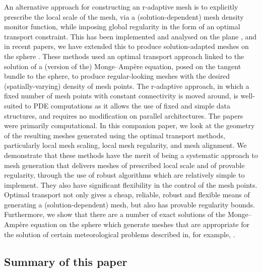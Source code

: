 \documentclass[11pt, a4paper]{scrartcl}  %
\theoremstyle{plain}
\theoremstyle{definition}
\numberwithin{equation}{section}
\begin{document}
An alternative approach for constructing an r-adaptive mesh is to
explicitly prescribe the local scale of the mesh, via a
(solution-dependent) mesh density monitor function, while imposing
global regularity in the form of an optimal transport constraint. This
has been implemented and analysed on the plane
\citep{budd2006parabolic,budd2009moving,chacon2011robust,browne2014fast,budd2015geometry},
and in recent papers, we have extended this to produce solution-adapted
meshes on the sphere \citep{weller2016mesh,mcrae2018optimal}.
These methods used an optimal
transport approach linked to the solution of a (version of the)
Monge--Ampère equation, posed on the tangent bundle to the sphere, to
produce regular-looking meshes with the desired (spatially-varying)
density of mesh points. The r-adaptive approach, in which a fixed number
of mesh points with constant connectivity is moved around, is
well-suited to PDE computations as it allows the use of fixed and simple
data structures, and requires no modification on parallel architectures.
The papers \citet{weller2016mesh,mcrae2018optimal} were primarily
computational. In this companion paper, we look at the geometry of the
resulting meshes generated using the optimal transport methods,
particularly local mesh scaling, local mesh regularity, and mesh
alignment. We demonstrate that these methods have the merit of being a
systematic approach to mesh generation that delivers meshes of
prescribed local scale and of provable regularity, through the use of
robust algorithms which are relatively simple to implement. They also
have significant flexibility in the control of the mesh points. Optimal
transport not only gives a cheap, reliable, robust and flexible means of
generating a (solution-dependent) mesh, but also has provable regularity
bounds. Furthermore, we show that there are a number of exact solutions
of the Monge--Ampère equation on the sphere which generate meshes that
are appropriate for the solution of certain meteorological problems
described in, for example, \citet{slingo2009developing}.

\subsection{Summary of this paper}
\end{document}
